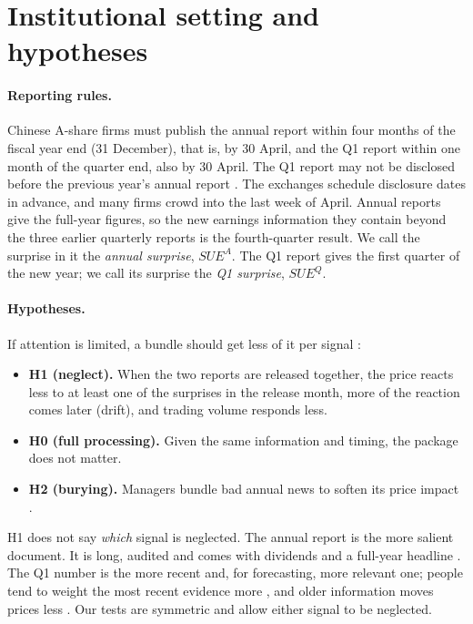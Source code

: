\documentclass[11pt]{article}
\newcommand{\SUEA}{SUE^{A}}
\newcommand{\SUEQ}{SUE^{Q}}
\begin{document}
\section{Institutional setting and hypotheses}

\paragraph{Reporting rules.} Chinese A-share firms must publish the annual report within four months of the fiscal
year end (31 December), that is, by 30 April, and the Q1 report within one month of the quarter end, also by 30
April. The Q1 report may not be disclosed before the previous year's annual report \citep{csrc_disclosure,sse_rules}.
The exchanges schedule disclosure dates in advance, and many firms crowd into the last week of April. Annual reports
give the full-year figures, so the new earnings information they contain beyond the three earlier quarterly reports
is the fourth-quarter result. We call the surprise in it the \emph{annual surprise}, $\SUEA$. The Q1 report gives the
first quarter of the new year; we call its surprise the \emph{Q1 surprise}, $\SUEQ$.

\paragraph{Hypotheses.} If attention is limited, a bundle should get less of it per signal
\citep{hirshleifer2003,hirshleifer2009}:

\begin{itemize}
\item \textbf{H1 (neglect).} When the two reports are released together, the price reacts less to at least one of the
surprises in the release month, more of the reaction comes later (drift), and trading volume responds less.
\item \textbf{H0 (full processing).} Given the same information and timing, the package does not matter.
\item \textbf{H2 (burying).} Managers bundle bad annual news to soften its price impact
\citep{dehaan2015,segal2016,li2020}.
\end{itemize}

H1 does not say \emph{which} signal is neglected. The annual report is the more salient document. It is long, audited
and comes with dividends and a full-year headline \citep{huang2018}. The Q1 number is the more recent and, for
forecasting, more relevant one; people tend to weight the most recent evidence more \citep{hogarth1992}, and older
information moves prices less \citep{tetlock2011}. Our tests are symmetric and allow either signal to be neglected.
\end{document}
